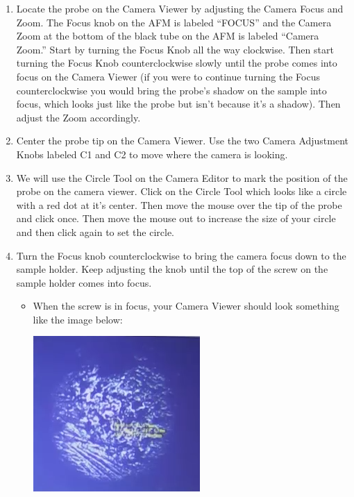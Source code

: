 \documentclass{../lab}
\begin{document}
\begin{enumerate}
    \item Locate the probe on the Camera Viewer by adjusting the Camera Focus and Zoom.  The Focus knob on the AFM is labeled ``FOCUS'' and the Camera Zoom at the bottom of the black tube on the AFM is labeled ``Camera Zoom.''  Start by turning the Focus Knob all the way clockwise.  Then start turning the Focus Knob counterclockwise slowly until the probe comes into focus on the Camera Viewer (if you were to continue turning the Focus counterclockwise you would bring the probe's shadow on the sample into focus, which looks just like the probe but isn't because it's a shadow).  Then adjust the Zoom accordingly.

    \item Center the probe tip on the Camera Viewer.  Use the two Camera Adjustment Knobs labeled C1 and C2 to move where the camera is looking.
    
    \item We will use the Circle Tool on the Camera Editor to mark the position of the probe on the camera viewer. Click on the Circle Tool which looks like a circle with a red dot at it's center. Then move the mouse over the tip of the probe and click once.  Then move the mouse out to increase the size of your circle and then click again to set the circle.
    
    \item Turn the Focus knob counterclockwise to bring the camera focus down to the sample holder.  Keep adjusting the knob until the top of the screw on the sample holder comes into focus.
    \begin{itemize}
        \item When the screw is in focus, your Camera Viewer should look something like the image below:
        \begin{center}
            \href{http://experimentationlab.berkeley.edu/sites/default/files/AFMImages/sampleholder.PNG}{\includegraphics[width=0.5\linewidth]{images/sampleholder.PNG}}
        \end{center}
    \end{itemize}
    

\end{enumerate}
\end{document}
